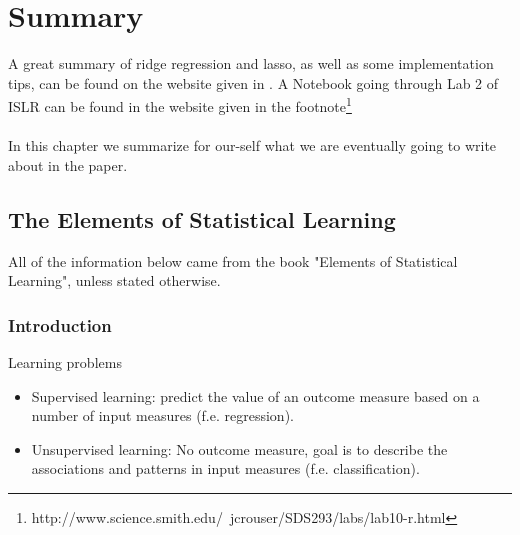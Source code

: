 \section*{Summary}
A great summary of ridge regression and lasso, as well as some implementation tips, can be found on the website given in \cite{Kas2018}. A Notebook going through Lab 2 of ISLR can be found in the website given in the footnote\footnote{http://www.science.smith.edu/~jcrouser/SDS293/labs/lab10-r.html}\\
\\
In this chapter we summarize for our-self what we are eventually going to write about in the paper.

\subsection*{The Elements of Statistical Learning}
All of the information below came from the book "Elements of Statistical Learning", unless stated otherwise.

\subsubsection*{Introduction}
Learning problems
\begin{itemize}
    \item Supervised learning: predict the value of an outcome measure based on a number of input measures (f.e. regression).
    \item Unsupervised learning: No outcome measure, goal is to describe the associations and patterns in input measures (f.e. classification).
\end{itemize}

